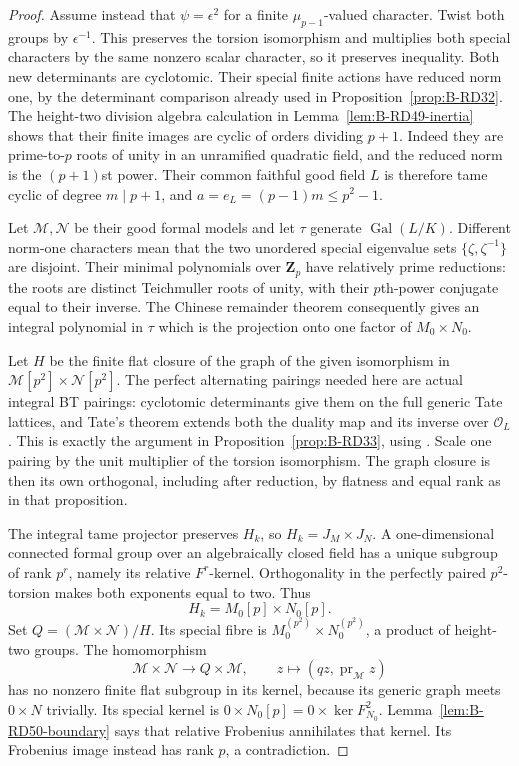 \begin{proof}
Assume instead that $\psi=\epsilon^2$ for a finite
$\mu_{p-1}$-valued character. Twist both groups by
$\epsilon^{-1}$. This preserves the torsion isomorphism and
multiplies both special characters by the same nonzero scalar
character, so it preserves inequality. Both new determinants
are cyclotomic. Their special finite actions have reduced norm
one, by the determinant comparison already used in
Proposition~\ref{prop:B-RD32}. The height-two division algebra
calculation in Lemma~\ref{lem:B-RD49-inertia} shows that their
finite images are cyclic of orders dividing $p+1$.
Indeed they are prime-to-$p$ roots of unity in an unramified
quadratic field, and the reduced norm is the $(p+1)$st power.
Their common faithful good field $L$ is therefore tame cyclic
of degree $m\mid p+1$, and $a=e_L=(p-1)m\leq p^2-1$.

Let $\mathcal M,\mathcal N$ be their good formal models and
let $\tau$ generate $\operatorname{Gal}(L/K)$.
Different norm-one characters mean that the two unordered
special eigenvalue sets $\{\zeta,\zeta^{-1}\}$ are disjoint.
Their minimal polynomials over $\mathbf Z_p$ have relatively
prime reductions: the roots are distinct Teichmuller roots
of unity, with their $p$th-power conjugate equal to their
inverse. The Chinese remainder theorem consequently gives
an integral polynomial in $\tau$ which is the projection
onto one factor of $M_0\times N_0$.

Let $H$ be the finite flat closure of the graph of the given
isomorphism in $\mathcal M[p^2]\times\mathcal N[p^2]$.
The perfect alternating pairings needed here are actual
integral BT pairings: cyclotomic determinants give them on
the full generic Tate lattices, and Tate's theorem extends
both the duality map and its inverse over $\mathcal O_L$.
This is exactly the argument in Proposition~\ref{prop:B-RD33},
using \cite[Theorem~4 and Corollaries~1--2, p.~181]
{Tate1967PDivisible}. Scale one pairing by the unit multiplier
of the torsion isomorphism. The graph closure is then its own
orthogonal, including after reduction, by flatness and equal
rank as in that proposition.

The integral tame projector preserves $H_k$, so
$H_k=J_M\times J_N$. A one-dimensional connected formal group
over an algebraically closed field has a unique subgroup of
rank $p^r$, namely its relative $F^r$-kernel. Orthogonality in
the perfectly paired $p^2$-torsion makes both exponents equal
to two. Thus
\[
                    H_k=M_0[p]\times N_0[p].            \tag{B-RD50.5}
\]
Set $Q=(\mathcal M\times\mathcal N)/H$. Its special fibre is
$M_0^{(p^2)}\times N_0^{(p^2)}$, a product of height-two groups.
The homomorphism
\[
 \mathcal M\times\mathcal N\longrightarrow Q\times\mathcal M,
              \qquad z\longmapsto(qz,\operatorname{pr}_{\mathcal M}z)
\]
has no nonzero finite flat subgroup in its kernel, because its
generic graph meets $0\times N$ trivially. Its special kernel
is $0\times N_0[p]=0\times\ker F_{N_0}^2$.
Lemma~\ref{lem:B-RD50-boundary} says that relative Frobenius
annihilates that kernel. Its Frobenius image instead has
rank $p$, a contradiction.


\end{proof}
